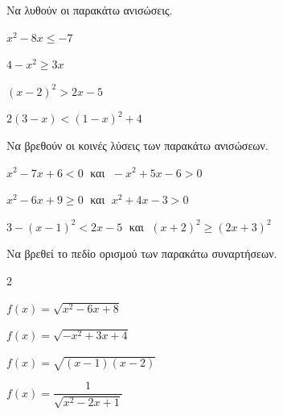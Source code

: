 \documentclass[11pt,a4paper,modern]{FFExercises}
\begin{document}
\askhsh Να λυθούν οι παρακάτω ανισώσεις.
\begin{alist}
\item $ x^2-8x\leq -7 $
\item $ 4-x^2\geq 3x $
\item $ (x-2)^2>2x-5 $
\item $ 2(3-x)<(1-x)^2+4 $
\end{alist}
\askhsh Να βρεθούν οι κοινές λύσεις των παρακάτω ανισώσεων.
\begin{alist}
\item $ x^2-7x+6<0 \;$ και $\; -x^2+5x-6>0 $
\item $ x^2-6x+9\geq0 \;$ και $\; x^2+4x-3>0 $
\item $ 3-(x-1)^2<2x-5 \;$ και $\; (x+2)^2\geq(2x+3)^2 $
\end{alist}
\askhsh Να βρεθεί το πεδίο ορισμού των παρακάτω συναρτήσεων.
\begin{multicols}{2}
\begin{alist}
\item $ f(x)=\sqrt{x^2-6x+8} $
\item $ f(x)=\sqrt{-x^2+3x+4} $
\item $ f(x)=\sqrt{(x-1)(x-2)} $
\item $ f(x)=\dfrac{1}{\sqrt{x^2-2x+1}} $
\end{alist}
\end{multicols}
\end{document}
